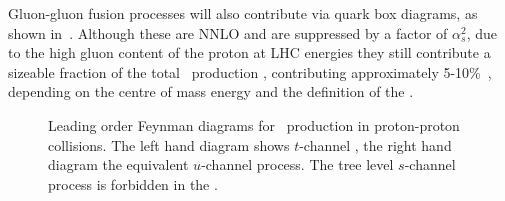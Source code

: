 Gluon-gluon fusion processes will also contribute via quark box diagrams, as
shown in~. Although these are NNLO and are suppressed by a
factor of $\alpha_s^2$, due to the high gluon content of the proton at LHC
energies they still contribute a sizeable fraction of the total \ZZ\ production
\cx, contributing approximately 5-10\%~\cite{Campbell:2011}, depending on the
centre of mass energy and the definition of the \cx.

\begin{figure}
\centering
    \hspace{10mm}
        \vspace{8mm}
\caption[Leading order Feynman diagrams for \ZZ\ production in proton-proton
collisions.]{Leading order Feynman diagrams for \ZZ\ production in proton-proton
collisions. The left hand diagram shows $t$-channel \qqZZ, the right hand
diagram the equivalent $u$-channel process. The tree level $s$-channel process is forbidden
in the \sm.}
\label{fig:theoryzz-fd-qqZZ}
\end{figure}

